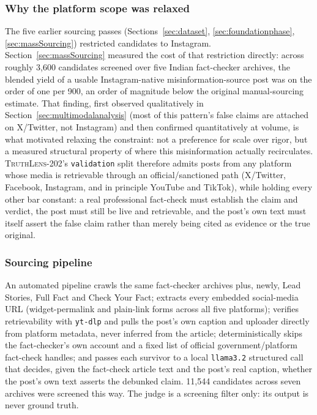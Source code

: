 \documentclass[conference]{IEEEtran}
\begin{document}
\subsubsection{Why the platform scope was relaxed}
The five earlier sourcing passes (Sections~\ref{sec:dataset},
\ref{sec:foundationphase}, \ref{sec:massSourcing}) restricted candidates
to Instagram. Section~\ref{sec:massSourcing} measured the cost of that
restriction directly: across roughly 3{,}600 candidates screened over
five Indian fact-checker archives, the blended yield of a usable
Instagram-native misinformation-source post was on the order of one per
900, an order of magnitude below the original manual-sourcing estimate.
That finding, first observed qualitatively in
Section~\ref{sec:multimodalanalysis} (most of this pattern's false claims
are attached on X/Twitter, not Instagram) and then confirmed
quantitatively at volume, is what motivated relaxing the constraint: not
a preference for scale over rigor, but a measured structural property of
where this misinformation actually recirculates. \textsc{TruthLens-202}'s
\texttt{validation} split therefore admits posts from any platform whose
media is retrievable through an official/sanctioned path (X/Twitter,
Facebook, Instagram, and in principle YouTube and TikTok), while holding
every other bar constant: a real professional fact-check must establish
the claim and verdict, the post must still be live and retrievable, and
the post's own text must itself assert the false claim rather than merely
being cited as evidence or the true original.

\subsubsection{Sourcing pipeline}
An automated pipeline crawls the same fact-checker archives plus, newly,
Lead Stories, Full Fact and Check Your Fact; extracts every embedded
social-media URL (widget-permalink and plain-link forms across all five
platforms); verifies retrievability with \texttt{yt-dlp} and pulls the
post's own caption and uploader directly from platform metadata, never
inferred from the article; deterministically skips the fact-checker's own
account and a fixed list of official government/platform fact-check
handles; and passes each survivor to a local \texttt{llama3.2}
structured call that decides, given the fact-check article text and the
post's real caption, whether the post's own text asserts the debunked
claim. 11{,}544 candidates across seven archives were screened this way.
The judge is a screening filter only: its output is never ground truth.
\end{document}
